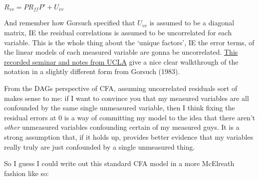\documentclass[
  letterpaper,
  DIV=11,
  numbers=noendperiod]{scrreprt}
\begin{document}
\(R_{vv} = PR_{ff}P' + U_{vv}\)

And remember how Gorsuch specified that \(U_{vv}\) is assumed to be a
diagonal matrix, IE the residual correlations is assumed to be
uncorrelated for each variable. This is the whole thing about the
`unique factors', IE the error terms, of the linear models of each
measured variable are gonna be uncorrelated.
\href{https://stats.oarc.ucla.edu/r/seminars/rcfa/}{This recorded
seminar and notes from UCLA} give a nice clear walkthrough of the
notation in a slightly different form from Gorsuch (1983).

From the DAGs perspective of CFA, assuming uncorrelated residuals sort
of makes sense to me: if I want to convince you that my measured
variables are all confounded by the same single unmeasured variable,
then I think fixing the residual errors at 0 is a way of committing my
model to the idea that there aren't \emph{other} unmeasured variables
confounding certain of my measured guys. It is a strong assumption that,
if it holds up, provides better evidence that my variables really truly
are just confounded by a single unmeasured thing.

So I guess I could write out this standard CFA model in a more McElreath
fashion like so:
\end{document}
